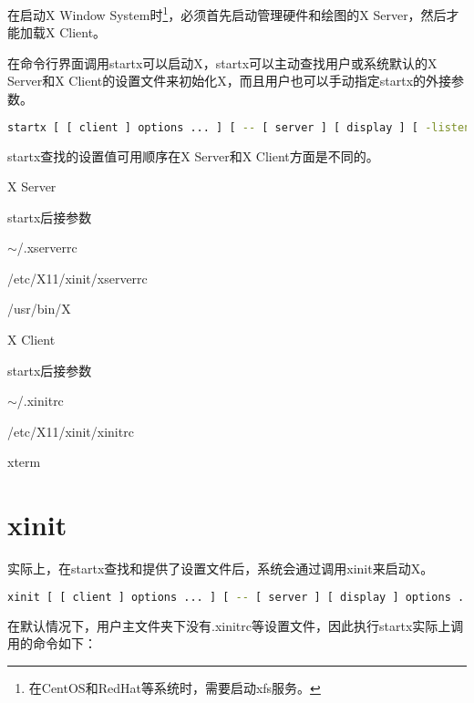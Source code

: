 在启动X Window System时\footnote{在CentOS和RedHat等系统时，需要启动xfs服务。}，必须首先启动管理硬件和绘图的X Server，然后才能加载X Client。

在命令行界面调用startx可以启动X，startx可以主动查找用户或系统默认的X Server和X Client的设置文件来初始化X，而且用户也可以手动指定startx的外接参数。

\begin{lstlisting}[language=bash]
startx [ [ client ] options ... ] [ -- [ server ] [ display ] [ -listen ] options ... ]
\end{lstlisting}

startx查找的设置值可用顺序在X Server和X Client方面是不同的。

\begin{compactitem}
\item X Server

\begin{compactenum}
\item startx后接参数
\item $\sim$/.xserverrc
\item /etc/X11/xinit/xserverrc
\item /usr/bin/X
\end{compactenum}

\item X Client

\begin{compactitem}
\item startx后接参数
\item $\sim$/.xinitrc
\item /etc/X11/xinit/xinitrc
\item xterm
\end{compactitem}

\end{compactitem}



\section{xinit}

实际上，在startx查找和提供了设置文件后，系统会通过调用xinit来启动X。


\begin{lstlisting}[language=bash]
xinit [ [ client ] options ... ] [ -- [ server ] [ display ] options ... ]
\end{lstlisting}


在默认情况下，用户主文件夹下没有.xinitrc等设置文件，因此执行startx实际上调用的命令如下：


